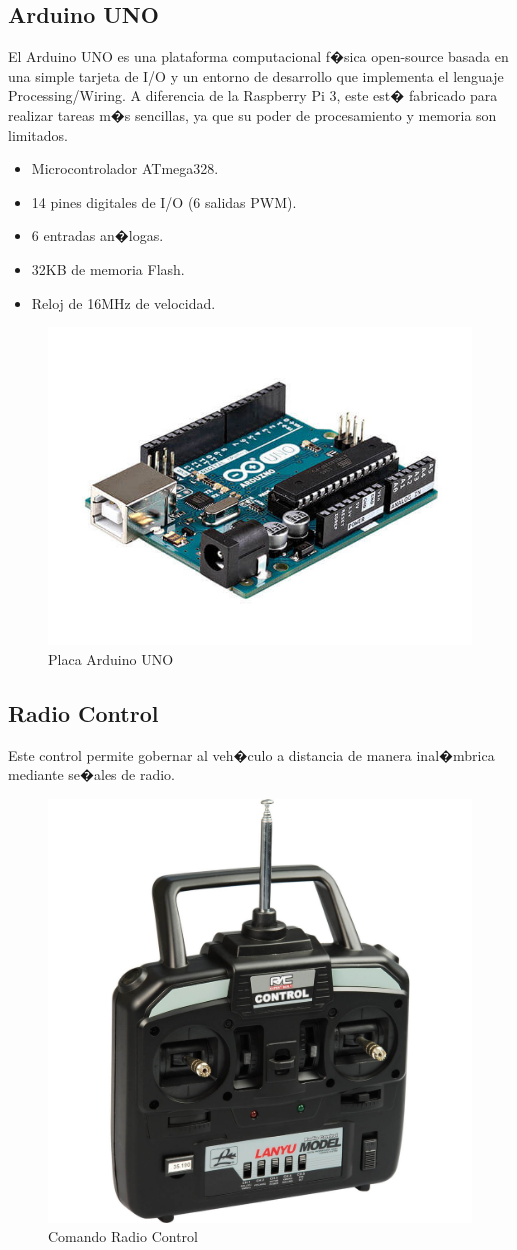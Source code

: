 	\subsection{Arduino UNO}
		El Arduino UNO es una plataforma computacional f�sica open-source basada en una simple tarjeta de I/O y un entorno de desarrollo que implementa el lenguaje Processing/Wiring. A diferencia de la Raspberry Pi 3, este est� fabricado para realizar tareas m�s sencillas, ya que su poder de procesamiento y memoria son limitados.
		\begin{itemize}
			\item Microcontrolador ATmega328.
			\item 14 pines digitales de I/O (6 salidas PWM).
			\item 6 entradas an�logas.
			\item 32KB de memoria Flash.
			\item Reloj de 16MHz de velocidad.	
		\end{itemize}
		\begin{figure}[h!]
			\centering
			\includegraphics[width=0.5\linewidth, height=0.2\textheight]{Imagenes/arduinouno}
			\caption{Placa Arduino UNO}
			\label{fig:arduinouno}
		\end{figure}
		

	\subsection{Radio Control}
		Este control permite gobernar al veh�culo a distancia de manera inal�mbrica mediante se�ales de radio.
		\begin{figure}[h]
			\centering
			\includegraphics[width=0.4\linewidth, height=0.2\textheight]{Imagenes/RCcontrol}
			\caption{Comando Radio Control}
			\label{fig:rccontrol}
		\end{figure}



